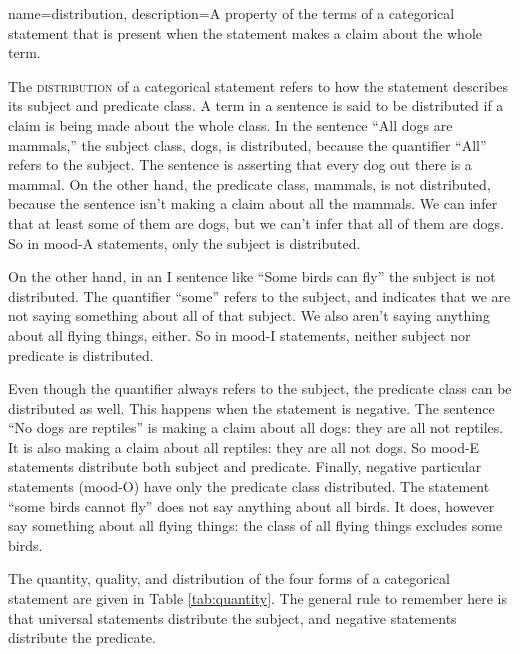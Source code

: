 {
name=distribution,
description={A property of the terms of a categorical statement that is present when the statement makes a claim about the whole term.}
}

The \textsc{\gls{distribution}} of a categorical statement refers to how the statement describes its subject and predicate class. A term in a sentence is said to be distributed \label{def:Distribution} if a claim is being made about the whole class. In the sentence ``All dogs are mammals,'' the subject class, dogs, is distributed, because the quantifier ``All'' refers to the subject. The sentence is asserting that every dog out there is a mammal. On the other hand, the predicate class, mammals, is not distributed, because the sentence isn't making a claim about all the mammals. We can infer that at least some of them are dogs, but we can't infer that all of them are dogs. So in mood-A statements, only the subject is distributed.

On the other hand, in an I sentence like ``Some birds can fly'' the subject is not distributed. The quantifier ``some'' refers to the subject, and indicates that we are not saying something about all of that subject. We also aren't saying anything about all flying things, either. So in mood-I statements, neither subject nor predicate is distributed.

Even though the quantifier always refers to the subject, the predicate class can be distributed as well. This happens when the statement is negative. The sentence ``No dogs are reptiles'' is making a claim about all dogs: they are all not reptiles. It is also making a claim about all reptiles: they are all not dogs. So mood-E statements distribute both subject and predicate. Finally, negative particular statements (mood-O) have only the predicate class distributed. The statement ``some birds cannot fly'' does not say anything about all birds. It does, however say something about all flying things: the class of all flying things excludes some birds.

The quantity, quality, and distribution of the four forms of a categorical statement are given in Table \ref{tab:quantity}. The general rule to remember here is that universal statements distribute the subject, and negative statements distribute the predicate.


